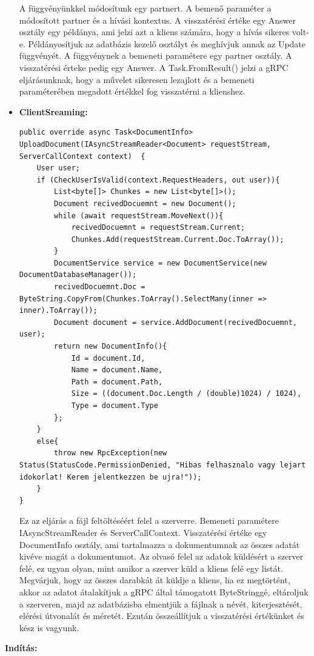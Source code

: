 \documentclass[
]{thesis-ekf}
\theoremstyle{definition}
\theoremstyle{remark}
\begin{document}
\begin{itemize}[leftmargin=0pt]
\begin{lstlisting}
	\end{lstlisting}
	A függvényünkkel módosítunk egy partnert. A bemenő paraméter a módosított partner és a hívási kontextus. A visszatérési értéke egy Answer osztály egy példánya, ami jelzi azt a kliens számára, hogy a hívás sikeres volt-e. Példányosítjuk az adatbázis kezelő osztályt és meghívjuk annak az Update függvényét. A függvénynek a bemeneti paramétere egy partner osztály. A visszatérési érteke pedig egy Answer. A Task.FromResult() jelzi a gRPC eljárásunknak, hogy a művelet sikeresen lezajlott és a bemeneti paraméterében megadott értékkel fog visszatérni a klienshez.
	\item \textbf{ClientSreaming: }
			\begin{lstlisting}
public override async Task<DocumentInfo> UploadDocument(IAsyncStreamReader<Document> requestStream, ServerCallContext context)  {
	User user;
    if (CheckUserIsValid(context.RequestHeaders, out user)){
		List<byte[]> Chunkes = new List<byte[]>();
		Document recivedDocuemnt = new Document();
		while (await requestStream.MoveNext()){
			recivedDocuemnt = requestStream.Current;
			Chunkes.Add(requestStream.Current.Doc.ToArray());
		}
		DocumentService service = new DocumentService(new DocumentDatabaseManager());
		recivedDocuemnt.Doc = ByteString.CopyFrom(Chunkes.ToArray().SelectMany(inner => inner).ToArray());
		Document document = service.AddDocument(recivedDocuemnt, user);
		return new DocumentInfo(){
			Id = document.Id,
			Name = document.Name,
			Path = document.Path,
			Size = ((document.Doc.Length / (double)1024) / 1024),
			Type = document.Type
		};
	}
	else{
		throw new RpcException(new Status(StatusCode.PermissionDenied, "Hibas felhasznalo vagy lejart idokorlat! Kerem jelentkezzen be ujra!"));
	}
}
	\end{lstlisting}
	Ez az eljárás a fájl feltöltéséért felel a szerverre. Bemeneti paramétere IAsyncStreamReader és ServerCallContext. Visszatérési értéke egy DocumentInfo osztály, ami tartalmazza a dokumentumnak az összes adatát kivéve magát a dokumentumot. Az olvasó felel az adatok küldésért a szerver felé, ez ugyan olyan, mint amikor a szerver küld a kliens felé egy listát. Megvárjuk, hogy az összes darabkát át küldje a kliens, ha ez megtörtént, akkor az adatot átalakítjuk a gRPC által támogatott ByteStringgé, eltároljuk a szerveren, majd az adatbázisba elmentjük a fájlnak a névét, kiterjesztését, elérési útvonalát és méretét. Ezután összeállítjuk a visszatérési értékünket és kész is vagyunk.
\end{itemize}
\textbf{Indítás: }
\end{document}
